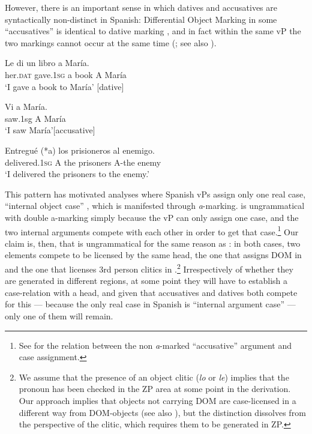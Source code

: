 \documentclass[output=paper,modfonts,nonflat,newtxmath,colorlinks,citecolor=brown]{langsci/langscibook}
\begin{document}
However, there is an important sense in which datives and accusatives are syntactically non-distinct in Spanish: Differential Object Marking in some ``accusatives'' is identical to dative marking , and in fact within the same vP the two markings cannot occur at the same time  (\citealt{OrmazabalRomero2013Probus}; see also \citet{chapters/cornilescu}).

\ea%
    \label{ex:cabre:19}
      \ea
    \gll Le di un libro a María.\\
    {her.\textsc{dat}}   gave.\textsc{1sg}   a {book} {A} {María} \\
    \glt ‘I gave a book to María’ \hfill [dative]
    
    \ex 
    \gll Vi a María.\\
    {saw.1sg} {A} {María}\\
    \glt  ‘I saw María’\hfill [accusative]
    \z
    \z

\ea%
    \label{ex:cabre:20}
    \gll Entregué (*a) los prisioneros al enemigo.\\
        delivered.\textsc{1sg} A  the prisoners  A-the  enemy\\
    \glt ‘I delivered the prisoners to the enemy.’
    \z

This pattern has motivated analyses where Spanish vPs assign only one real case, ``internal object case'' \citep{Romero2012, OrmazabalRomero2013Probus}, which is manifested through \textit{a}{}-marking.  is ungrammatical with double a-marking simply because the vP can only assign one case, and the two internal arguments compete with each other in order to get that case.\footnote{See \citet{Romero2012} for the relation between the non \textit{a}{}-marked ``accusative'' argument and case assignment.}  Our claim is, then, that  is ungrammatical for the same reason as : in both cases, two elements compete to be licensed by the same head, the one that assigns DOM in  and the one that licenses 3rd person clitics in .\footnote{We assume that the presence of an object clitic (\textit{lo} or \textit{le}) implies that the pronoun has been checked in the ZP area at some point in the derivation. Our approach implies that objects not carrying DOM are case-licensed in a different way from DOM-objects (see also \citealt{López2012}), but the distinction dissolves from the perspective of the clitic, which requires them to be generated in ZP.} Irrespectively of whether they are generated in different regions, at some point they will have to establish a case-relation with a head, and given that accusatives and datives both compete for this — because the only real case in Spanish is ``internal argument case'' — only one of them will remain.  
\end{document}
